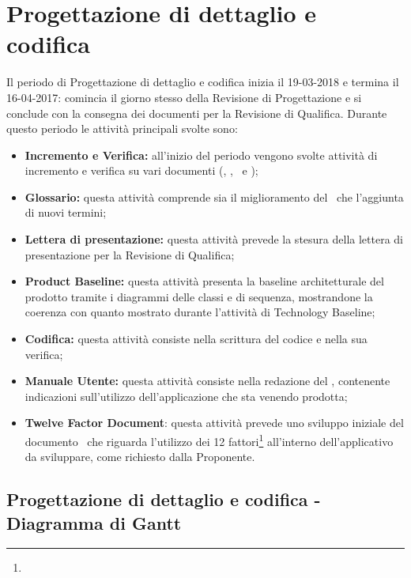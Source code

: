 \documentclass[PianoDiProgetto.tex]{subfiles}
\begin{document}
\section{Progettazione di dettaglio e codifica}
Il periodo di Progettazione di dettaglio e codifica inizia il 19-03-2018 e termina il 16-04-2017: comincia il giorno stesso della Revisione di Progettazione e si conclude con la consegna dei documenti per la Revisione di Qualifica. Durante questo periodo le attività principali svolte sono:
\begin{itemize}
	\item \textbf{Incremento e Verifica:} all'inizio del periodo vengono svolte attività di incremento e verifica su vari documenti (\ndp, \pdp, \pdq\ e \tb);
	\item \textbf{Glossario:} questa attività comprende sia il miglioramento del \g\ che l'aggiunta di nuovi termini;
	\item \textbf{Lettera di presentazione:} questa attività prevede la stesura della lettera di presentazione per la Revisione di Qualifica;
	\item \textbf{Product Baseline:} questa attività presenta la baseline architetturale del prodotto tramite i  diagrammi delle classi e di sequenza, mostrandone la coerenza con quanto mostrato durante l'attività di Technology Baseline;
	\item \textbf{Codifica:} questa attività consiste nella scrittura del codice e nella sua verifica;
	\item \textbf{Manuale Utente:} questa attività consiste nella redazione del \mut, contenente indicazioni sull’utilizzo dell'applicazione che sta venendo prodotta;
	\item \textbf{Twelve Factor Document}: questa attività prevede uno sviluppo iniziale del documento \tfd\ che riguarda l'utilizzo dei 12 fattori\footnote{} all'interno dell'applicativo da sviluppare, come richiesto dalla Proponente.
\end{itemize}
\begin{landscape}
		\subsection{Progettazione di dettaglio e codifica - Diagramma di Gantt}
\end{landscape}
\end{document}
